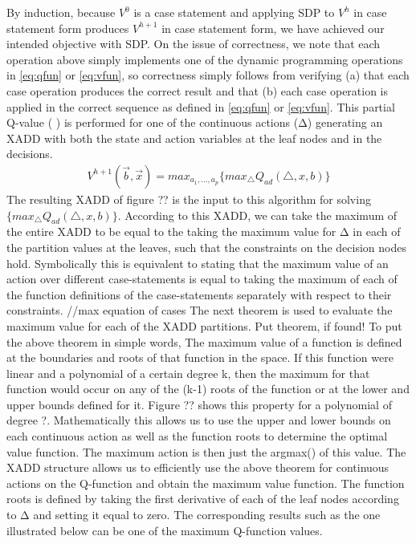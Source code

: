 \documentclass[letterpaper]{article}
\renewcommand{\-}{\text{-}}
\begin{document}
By induction, because $V^0$ is a case statement and applying
SDP to $V^h$ in case statement form produces $V^{h+1}$ in case
statement form, we have achieved our intended
objective with SDP.  On the issue of correctness,
we note that each operation above simply implements one of the
dynamic programming operations in \eqref{eq:qfun} or \eqref{eq:vfun}, 
so correctness simply follows from verifying (a) that each case
operation produces the correct result and that (b) each case operation
is applied in the correct sequence as defined in \eqref{eq:qfun} or 
\eqref{eq:vfun}.  
This partial Q-value ( ) is performed for one of the continuous actions (Δ) generating an XADD with both the state and action variables at the leaf nodes and in the decisions. 
\begin{align}
V^{h+1}(\overrightarrow{b},\overrightarrow{x})=max_{a_{1},...,a_{p}}\{max_{\bigtriangleup}Q_{ad}(\bigtriangleup,x,b)\}
\end{align}
The resulting XADD of figure ?? is the input to this algorithm for solving  $\{max_{\bigtriangleup}Q_{ad}(\bigtriangleup,x,b)\}$.
According to this XADD, we can take the maximum of the entire XADD to be equal to the taking the maximum value for Δ in each of the partition values at the leaves, such that the constraints on the decision nodes hold. Symbolically this is equivalent to stating that the maximum value of an action over different case-statements is equal to taking the maximum of each of the function definitions of the case-statements separately with respect to their constraints.
//max equation of cases
The next theorem is used to evaluate the maximum value for each of the XADD partitions. 
Put theorem, if found!  
To put the above theorem in simple words, The maximum value of a function is defined at the boundaries and roots of that function in the space. If this function were linear and a polynomial of a certain degree k, then the maximum for that function would occur on any of the (k-1) roots of the function or at the lower and upper bounds defined for it. Figure ?? shows this property for a polynomial of degree ?. Mathematically this allows us to use the upper and lower bounds on each continuous action as well as the function roots to determine the optimal value function. The maximum action is then just the argmax() of this value. 
The XADD structure allows us to efficiently use the above theorem for continuous actions on the Q-function and obtain the maximum value function. The function roots is defined by taking the first derivative of each of the leaf nodes according to Δ and setting it equal to zero. The corresponding results such as the one illustrated below can be one of the maximum Q-function values. 
\end{document}
